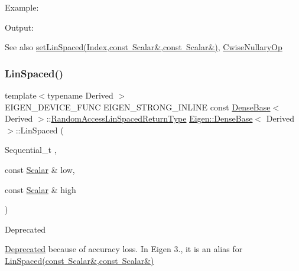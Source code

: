 Example\+: 
\begin{DoxyCodeInclude}{0}
\end{DoxyCodeInclude}
 Output\+: 
\begin{DoxyVerbInclude}
\end{DoxyVerbInclude}


\begin{DoxySeeAlso}{See also}
\mbox{\hyperlink{class_eigen_1_1_dense_base_a17a69cfd1b44b64f26b1a0f00666a871}{set\+Lin\+Spaced(\+Index,const Scalar\&,const Scalar\&)}}, \mbox{\hyperlink{class_eigen_1_1_cwise_nullary_op}{Cwise\+Nullary\+Op}} 
\end{DoxySeeAlso}
\mbox{\label{class_eigen_1_1_dense_base_ad69f2e4769d8b4e667fafba18c9cfb56}} 
\subsubsection{\texorpdfstring{LinSpaced()}{LinSpaced()}\hspace{0.1cm}{\footnotesize\ttfamily [3/4]}}
{\footnotesize\ttfamily template$<$typename Derived $>$ \\
E\+I\+G\+E\+N\+\_\+\+D\+E\+V\+I\+C\+E\+\_\+\+F\+U\+NC E\+I\+G\+E\+N\+\_\+\+S\+T\+R\+O\+N\+G\+\_\+\+I\+N\+L\+I\+NE const \mbox{\hyperlink{class_eigen_1_1_dense_base}{Dense\+Base}}$<$ Derived $>$\+::\mbox{\hyperlink{class_eigen_1_1_cwise_nullary_op}{Random\+Access\+Lin\+Spaced\+Return\+Type}} \mbox{\hyperlink{class_eigen_1_1_dense_base}{Eigen\+::\+Dense\+Base}}$<$ Derived $>$\+::Lin\+Spaced (\begin{DoxyParamCaption}\item[{Sequential\+\_\+t}]{,  }\item[{const \mbox{\hyperlink{class_eigen_1_1_dense_base_a5feed465b3a8e60c47e73ecce83e39a2}{Scalar}} \&}]{low,  }\item[{const \mbox{\hyperlink{class_eigen_1_1_dense_base_a5feed465b3a8e60c47e73ecce83e39a2}{Scalar}} \&}]{high }\end{DoxyParamCaption})\hspace{0.3cm}{\ttfamily [static]}}

\begin{DoxyRefDesc}{Deprecated}
\item[\mbox{\hyperlink{deprecated__deprecated000004}{Deprecated}}]because of accuracy loss. In Eigen 3., it is an alias for \mbox{\hyperlink{class_eigen_1_1_dense_base_a1dd502457286f60df1c3e90f9192c542}{Lin\+Spaced(const Scalar\&,const Scalar\&)}}\end{DoxyRefDesc}


